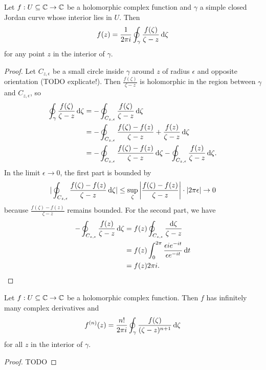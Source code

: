 \begin{theorem}
Let $f: U\subseteq \mathbb{C} \to \mathbb{C}$ be a holomorphic complex function and $\gamma$ a simple closed Jordan curve whose interior lies in $U$. Then
\[ f(z) = \frac{1}{2\pi i}\oint_\gamma \frac{f(\zeta)}{\zeta - z}\operatorname{d \!}{\zeta} \]
for any point $z$ in the interior of $\gamma$.
\end{theorem}
\begin{proof}
Let $C_{z,\epsilon}$ be a small circle inside $\gamma$ around $z$ of radius $\epsilon$ and opposite orientation (TODO explicate!). Then $\frac{f(\zeta)}{\zeta - z}$ is holomorphic in the region between $\gamma$ and $C_{z,\epsilon}$, so
\begin{align}
\oint_\gamma \frac{f(\zeta)}{\zeta - z}\operatorname{d \!}{\zeta} &= -\oint_{C_{z,\epsilon}} \frac{f(\zeta)}{\zeta - z}\operatorname{d \!}{\zeta} \\
&= -\oint_{C_{z,\epsilon}} \frac{f(\zeta)-f(z)}{\zeta - z} + \frac{f(z)}{\zeta - z}\operatorname{d \!}{\zeta} \\
&= -\oint_{C_{z,\epsilon}} \frac{f(\zeta)-f(z)}{\zeta - z}\operatorname{d \!}{\zeta} -\oint_{C_{z,\epsilon}}\frac{f(z)}{\zeta - z}\operatorname{d \!}{\zeta}.
\end{align}
In the limit $\epsilon \to 0$, the first part is bounded by
\[ |\oint_{C_{z,\epsilon}} \frac{f(\zeta)-f(z)}{\zeta - z}\operatorname{d \!}{\zeta}| \leq \sup_\zeta\left|\frac{f(\zeta)-f(z)}{\zeta - z}\right| \cdot |2\pi\epsilon| \to 0 \]
because $\frac{f(\zeta)-f(z)}{\zeta - z}$ remains bounded. For the second part, we have
\begin{align*}
-\oint_{C_{z,\epsilon}} \frac{f(z)}{\zeta - z}\operatorname{d \!}{\zeta} &= f(z)\oint_{C_{z,\epsilon}} \frac{\operatorname{d \!}{\zeta}}{\zeta - z} \\
&= f(z)\int_0^{2\pi}\frac{\epsilon ie^{-it}}{\epsilon e^{-it}}\operatorname{d \!}{t} \\
&= f(z)2\pi i.
\end{align*}
\end{proof}
\begin{corollary}
Let $f: U\subseteq \mathbb{C} \to \mathbb{C}$ be a holomorphic complex function. Then $f$ has infinitely many complex derivatives and
\[ f^{(n)}(z) = \frac{n!}{2\pi i}\oint_\gamma \frac{f(\zeta)}{(\zeta-z)^{n+1}}\operatorname{d \!}{\zeta} \]
for all $z$ in the interior of $\gamma$.
\end{corollary}
\begin{proof}
TODO
\end{proof}

